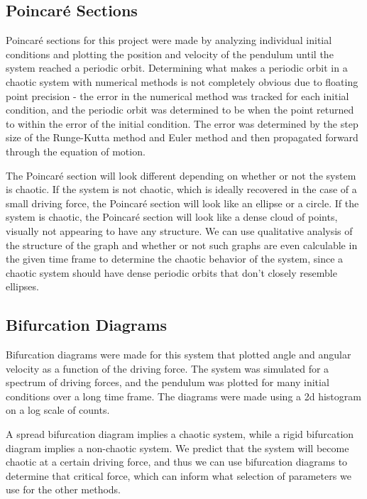\documentclass[11pt]{article} %
\begin{document}
    \subsection{Poincar\'e Sections}
        Poincar\'e sections for this project were made by analyzing individual initial conditions and plotting the position
        and velocity of the pendulum until the system reached a periodic orbit.  Determining what makes a periodic orbit in a 
        chaotic system with numerical methods is not completely obvious due to floating point precision - the error in the numerical 
        method was tracked for each initial condition, and the periodic orbit was determined to be when the point returned to within the
        error of the initial condition. The error was determined by the step size of the Runge-Kutta method and Euler method and then
        propagated forward through the equation of motion.\\\vspace{3mm}

        The Poincar\'e section will look different depending on whether or not the system is chaotic. If the system is not chaotic,
        which is ideally recovered in the case of a small driving force, the Poincar\'e section will look like
        an ellipse or a circle. If the system is chaotic, the Poincar\'e section will look like a dense cloud of points, visually
        not appearing to have any structure. We can use qualitative analysis of the structure of the graph and whether or not such
        graphs are even calculable in the given time frame to determine the chaotic behavior of the system, since a chaotic system should
        have dense periodic orbits that don't closely resemble ellipses.\\
    \subsection{Bifurcation Diagrams}
        Bifurcation diagrams were made for this system that plotted angle and angular velocity as a function of the driving force. The system
        was simulated for a spectrum of driving forces, and the pendulum was plotted for many initial conditions over a 
        long time frame. The diagrams were made using a 2d histogram on a log scale of counts.\\\vspace{3mm}

        A spread bifurcation diagram implies a chaotic system, while a rigid bifurcation diagram implies a non-chaotic
        system. We predict that the system will become chaotic at a certain driving force, and thus we can use bifurcation
        diagrams to determine that critical force, which can inform what selection of parameters we use for the other methods.\\
\end{document}
